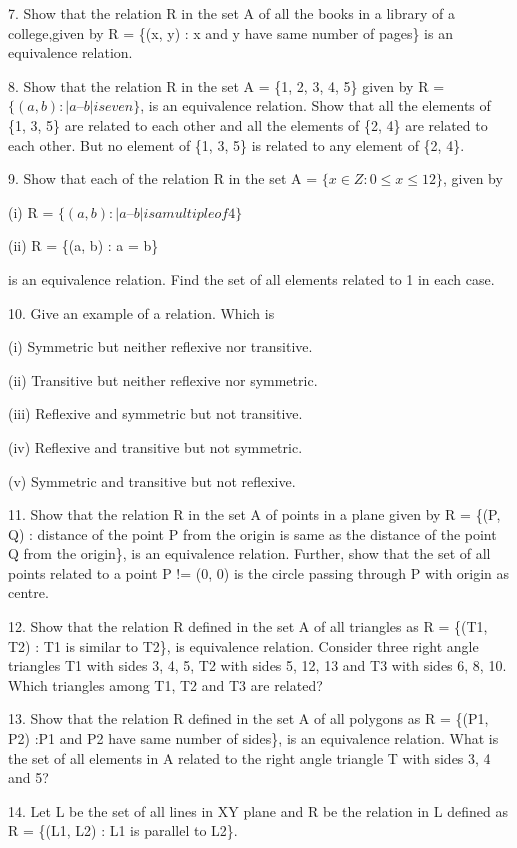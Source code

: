 \documentclass[12pt]{article}
\begin{document}
\begin{enumerate}
7. Show that the relation R in the set A  of all the books in a library of a college,given by R = \{(x, y) : x  and y  have same number of pages\} is an equivalence relation.

8. Show that the relation R in the set A  = \{1, 2, 3, 4, 5\} given by R = $\{(a, b) : \left|a – b\right| is even\}$, is an equivalence relation. Show that all the elements of \{1, 3, 5\} are related to each other and all the elements of \{2, 4\} are related to each other. But no element of \{1, 3, 5\} is related to any element of \{2, 4\}.

9. Show that each of the relation R in the set A  = $\{x \in Z  : 0 \leq x \leq  12\}$, given by

(i) R = $\{(a, b) : \left|a  – b\right|is a multiple of 4\}$

(ii) R = \{(a, b) : a  = b\}

is an equivalence relation. Find the set of all elements related to 1 in each case.

10. Give an example of a relation. Which is

(i) Symmetric but neither reflexive nor transitive.

(ii) Transitive but neither reflexive nor symmetric.

(iii) Reflexive and symmetric but not transitive.

(iv) Reflexive and transitive but not symmetric.

(v) Symmetric and transitive but not reflexive.

11. Show that the relation R in  the set A  of points in  a plane given by R = \{(P, Q)  : distance of the point P  from the origin is same as the distance of the point Q from the origin\}, is an equivalence relation. Further, show that the set of all points related to a point P !=  (0, 0) is the circle passing through P with origin as centre.

12. Show that the relation R defined in the set A  of all triangles as R = \{(T1, T2) : T1 is similar to T2\}, is equivalence relation. Consider three right angle triangles T1 with sides 3, 4, 5, T2 with sides 5, 12, 13 and T3 with sides 6, 8, 10. Which triangles among T1, T2 and T3 are related?

13. Show that the relation R defined in the set A  of all polygons as R = \{(P1, P2) :P1 and P2 have same number of sides\}, is an equivalence relation. What is the set of all elements in A  related to the right angle triangle T  with sides 3, 4 and 5?

14. Let L be the set of all lines in XY plane and R be the relation in L defined as R = \{(L1, L2) : L1 is parallel to L2\}.


\end{enumerate}
\end{document}
